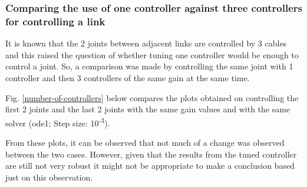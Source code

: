 \documentclass[a4paper,12pt]{report}
\begin{document}
\subsubsection{Comparing the use of one controller against three controllers for controlling a link}

It is known that the 2 joints between adjacent links are controlled by 3 cables and this raised the question of whether tuning one controller would be enough to control a joint. So, a comparison was made by controlling the same joint with 1 controller and then 3 controllers of the same gain at the same time.

Fig. \ref{number-of-controllers} below compares the plots obtained on controlling the first 2 joints and the last 2 joints with the same gain values and with the same solver (ode1; Step size: 10\textsuperscript{-3}).

From these plots, it can be observed that not much of a change was observed between the two cases. However, given that the results from the tuned controller are still not very robust it might not be appropriate to make a conclusion based just on this observation.
\end{document}
